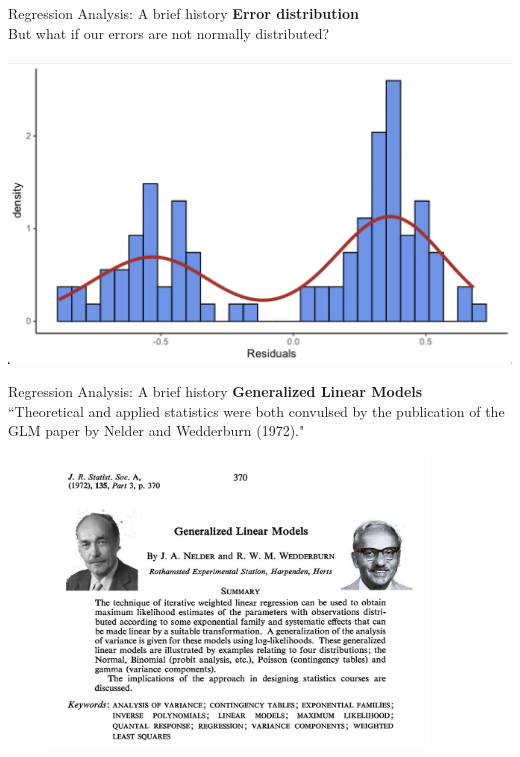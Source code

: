 \documentclass[t]{beamer} 	%
\begin{document}
\begin{frame}{Regression Analysis: A brief history}
	\textbf{Error distribution} \\
	But what if our errors are not normally distributed? \\
	$\:$
	\includegraphics[width=\textwidth, trim={0.2cm 0cm 0.2cm 0.5cm}, clip]{images/residuals.png}
\end{frame}

\begin{frame}{Regression Analysis: A brief history}
	\textbf{Generalized Linear Models} \\
	``Theoretical and applied statistics were both convulsed by the publication of the GLM paper
		by Nelder and Wedderburn (1972)." \citep{murray2018}
	\begin{figure}
		\centering
		\includegraphics[width=0.9\textwidth, trim={0cm 5cm 0cm 0cm}, clip]{images/glmpub.jpg}
	\end{figure}
\end{frame}
\end{document}
